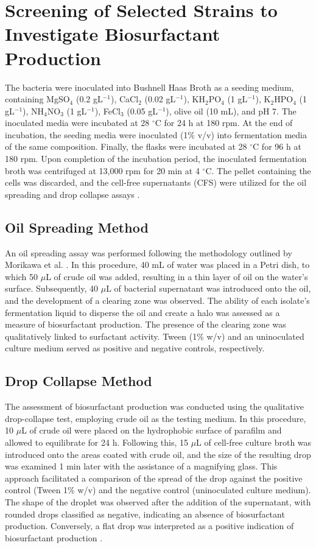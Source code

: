 \documentclass{svjour3}
\begin{document}
\section{Screening of Selected Strains to Investigate Biosurfactant Production}
The bacteria were inoculated into Bushnell Haas Broth as a seeding medium, containing MgSO$_4$ (0.2 gL$^{-1}$), CaCl$_2$ (0.02 gL$^{-1}$), KH$_2$PO$_4$ (1 gL$^{-1}$), K$_2$HPO$_4$ (1 gL$^{-1}$), NH$_4$NO$_3$ (1 gL$^{-1}$), FeCl$_3$ (0.05 gL$^{-1}$), olive oil (10 mL), and pH 7. The inoculated media were incubated at 28 $^{\circ}$C for 24 h at 180 rpm. At the end of incubation, the seeding media were inoculated (1\% v/v) into fermentation media of the same composition. Finally, the flasks were incubated at 28 $^{\circ}$C for 96 h at 180 rpm. Upon completion of the incubation period, the inoculated fermentation broth was centrifuged at 13,000 rpm for 20 min at 4 $^{\circ}$C. The pellet containing the cells was discarded, and the cell-free supernatants (CFS) were utilized for the oil spreading and drop collapse assays \cite{20}.
\subsection{Oil Spreading Method}
An oil spreading assay was performed following the methodology outlined by Morikawa et al. \cite{21}. In this procedure, 40 mL of water was placed in a Petri dish, to which 50 $\mu$L of crude oil was added, resulting in a thin layer of oil on the water's surface. Subsequently, 40 $\mu$L of bacterial supernatant was introduced onto the oil, and the development of a clearing zone was observed. The ability of each isolate's fermentation liquid to disperse the oil and create a halo was assessed as a measure of biosurfactant production. The presence of the clearing zone was qualitatively linked to surfactant activity. Tween (1\% w/v) and an uninoculated culture medium served as positive and negative controls, respectively.
\subsection{Drop Collapse Method}
The assessment of biosurfactant production was conducted using the qualitative drop-collapse test, employing crude oil as the testing medium. In this procedure, 10 $\mu$L of crude oil were placed on the hydrophobic surface of parafilm and allowed to equilibrate for 24 h. Following this, 15 $\mu$L of cell-free culture broth was introduced onto the areas coated with crude oil, and the size of the resulting drop was examined 1 min later with the assistance of a magnifying glass. This approach facilitated a comparison of the spread of the drop against the positive control (Tween 1\% w/v) and the negative control (uninoculated culture medium). The shape of the droplet was observed after the addition of the supernatant, with rounded drops classified as negative, indicating an absence of biosurfactant production. Conversely, a flat drop was interpreted as a positive indication of biosurfactant production \cite{22}.
\end{document}

